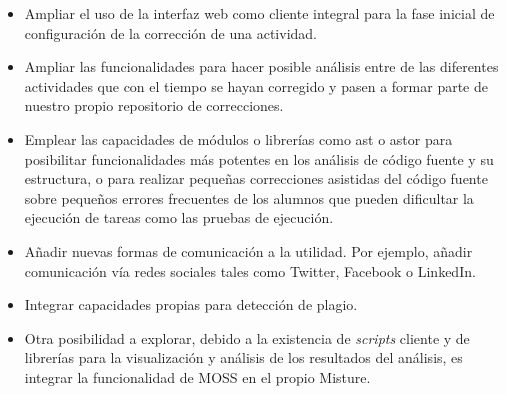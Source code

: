 \begin{itemize}
\item Ampliar el uso de la interfaz web como cliente integral para la fase inicial de configuración de la corrección de una actividad.

\item Ampliar las funcionalidades para hacer posible análisis entre de las diferentes actividades que con el tiempo se hayan corregido y pasen a formar parte de nuestro propio repositorio de correcciones.

\item Emplear las capacidades de módulos o librerías como ast o astor para posibilitar funcionalidades más potentes en los análisis de código fuente y su estructura, o para realizar pequeñas correcciones asistidas del código fuente sobre pequeños errores frecuentes de los alumnos que pueden dificultar la ejecución de tareas como las pruebas de ejecución.

\item Añadir nuevas formas de comunicación a la utilidad. Por ejemplo, añadir comunicación vía redes sociales tales como Twitter, Facebook o LinkedIn.

\item Integrar capacidades propias para detección de plagio.

\item Otra posibilidad a explorar, debido a la existencia de \textit{scripts} cliente y de librerías para la visualización y análisis de los resultados del análisis, es integrar la funcionalidad de MOSS en el propio Misture.
\end{itemize}
